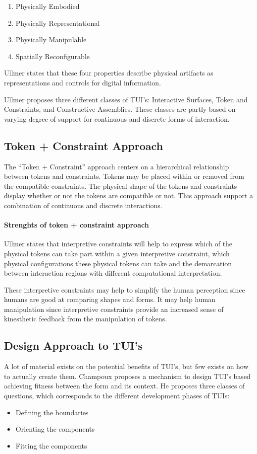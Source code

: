 \begin{enumerate}
	\item{Physically Embodied}
	\item{Physically Representational}
	\item{Physically Manipulable}
	\item{Spatially Reconfigurable}
\end{enumerate}

Ullmer states that these four properties describe physical artifacts as representations and controls for digital information. 

Ullmer proposes three different classes of TUI's: Interactive Surfaces, Token and Constraints, and Constructive Assemblies. These classes are partly based on varying degree of support for continuous and discrete forms of interaction\cite{ullmer2002tangible}.

\subsection{Token + Constraint Approach}
The ``Token + Constraint'' approach centers on a hierarchical relationship between tokens and constraints. Tokens may be placed within or removed from the compatible constraints. The physical shape of the tokens and constraints display whether or not the tokens are compatible or not. This approach support a combination of continuous and discrete interactions. 

\paragraph{Strenghts of token + constraint approach}
Ullmer states that interpretive constraints will help to express which of the physical tokens can take part within a given interpretive constraint, which physical configurations these physical tokens can take and the demarcation between interaction regions with different computational interpretation.

These interpretive constraints may help to simplify the human perception since humans are good at comparing shapes and forms. 
It may help human manipulation since interpretive constraints provide an increased sense of kinesthetic feedback from the manipulation of tokens. 



\subsection{Design Approach to TUI's}
A lot of material exists on the potential benefits of TUI's, but few exists on how to actually create them. Champoux proposes a mechanism to design TUI's based achieving fitness between the form and its context\cite{subramaniandesign}.
He proposes three classes of questions, which corresponds to the different development phases of TUIs:
\begin{itemize}
  \item Defining the boundaries
  \item Orienting the components
  \item Fitting the components
\end{itemize} 


